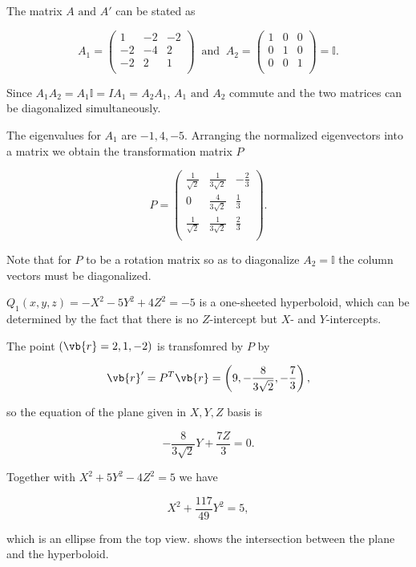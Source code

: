 \documentclass[a4paper,12pt]{report}
\begin{document}
{The matrix \(A \text { and } A'\) can be stated as 

\begin{equation}
    A_1  = \begin{pmatrix}
        1 & -2 &  -2 \\
        -2 & -4 &  2 \\
        -2 & 2 &  1 \\
    \end{pmatrix} ~\text { and }~ A_{2} = \begin{pmatrix}
        1 & 0 &  0 \\
        0 & 1 &  0 \\
        0 & 0 &  1 \\
    \end{pmatrix} = \mathbb{I} .
\end{equation}

Since \(A_1 A_2 = A_1 \mathbb{I} = IA_1 = A_2 A_1 \), \(A_1 \text { and } A_2 \) commute and the two matrices can be diagonalized simultaneously.

The eigenvalues for \(A_1 \) are \(-1,4,-5\). Arranging the normalized eigenvectors into a matrix we obtain the transformation matrix \(P\) 

\begin{equation}
    P = \begin{pmatrix}
        \frac{1}{\sqrt{2} }  & \frac{1}{3\sqrt{2} }  & -\frac{2}{3}   \\
        0 & \frac{4}{3\sqrt{2} }  & \frac{1}{3}   \\
        \frac{1}{\sqrt{2} }  & \frac{1}{3\sqrt{2} }  & \frac{2}{3}   \\
    \end{pmatrix}.
\end{equation}

Note that for \(P\) to be a rotation matrix so as to diagonalize \(A_2 = \mathbb{I}\) the column vectors must be diagonalized. 

\(Q_1 (x,y,z) = -X^2 -5Y^2 + 4Z^2 = -5\) is a one-sheeted hyperboloid, which can be determined by the fact that there is no \(Z\)-intercept but \(X\)- and \(Y\)-intercepts. 

The point \((\vb{r} = 2,1,-2)\) is transfomred by \(P\) by 

\begin{equation}
    \vb{r} ' = P^T \vb{r} = \left( 9,-\frac{8}{3\sqrt{2} }, -\frac{7}{3}   \right),
\end{equation}

so the equation of the plane given in \(X,Y,Z\) basis is 

\begin{equation}
    -\frac{8}{3\sqrt{2} }Y + \frac{7Z}{3} = 0.
\end{equation}

Together with \(X^2+5Y^2-4Z^2=5\) we have 

\begin{equation}
    X^2 + \frac{117}{49} Y^2 = 5,
\end{equation}

which is an ellipse from the top view.  shows the intersection between the plane and the hyperboloid.
} 
\end{document}

